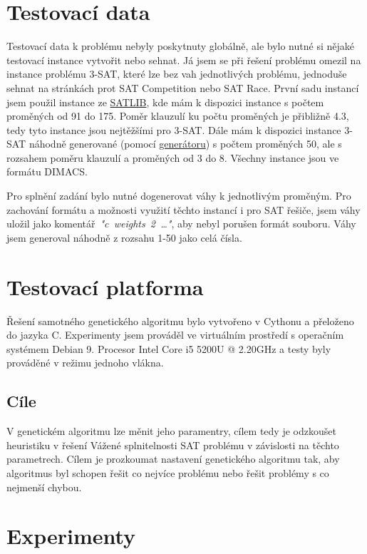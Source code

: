 \documentclass[11pt]{article}
\begin{document}
\section{Testovací data}\label{kap:data}
Testovací data k problému nebyly poskytnuty globálně, ale bylo nutné si nějaké testovací instance vytvořit nebo sehnat. Já jsem se při řešení problému omezil na instance problému 3-SAT, které lze bez vah jednotlivých problému, jednoduše sehnat na stránkách prot SAT Competition nebo SAT Race. První sadu instancí jsem použil instance ze \href{https://www.cs.ubc.ca/~hoos/SATLIB/benchm.html}{SATLIB}, kde mám k dispozici instance s počtem proměných od 91 do 175. Poměr klauzulí ku počtu proměných je přibližně 4.3, tedy tyto instance jsou nejtěžšími pro 3-SAT. Dále mám k dispozici instance 3-SAT náhodně generované (pomocí \href{https://toughsat.appspot.com/}{generátoru}) s počtem proměných 50, ale s rozsahem poměru klauzulí a proměných od 3 do 8. Všechny instance jsou ve formátu DIMACS. 

Pro splnění zadání bylo nutné dogenerovat váhy k jednotlivým proměným. Pro zachování formátu a možnosti využití těchto instancí i pro SAT řešiče, jsem váhy uložil jako komentář~\textit{"c~weights~2~\dots"}, aby nebyl porušen formát souboru. Váhy jsem generoval náhodně z rozsahu 1-50 jako celá čísla. 

\section{Testovací platforma}\label{kap:platform}
Řešení samotného genetického algoritmu bylo vytvořeno v Cythonu a přeloženo do jazyka C. Experimenty jsem prováděl ve virtuálním prostředí s operačním systémem Debian 9. Procesor Intel Core i5 5200U @ 2.20GHz a testy byly prováděné v režimu jednoho vlákna.
\subsection{Cíle}\label{kap:cil}

V genetickém algoritmu lze měnit jeho paramentry, cílem tedy je odzkoušet heuristiku v řešení Vážené splnitelnosti SAT problému v závislosti na těchto parametrech. Cílem je prozkoumat nastavení genetického algoritmu tak, aby algoritmus byl schopen řešit co nejvíce problému nebo řešit problémy s co nejmenší chybou.


\section{Experimenty}\label{kap:experiments}
\end{document}
